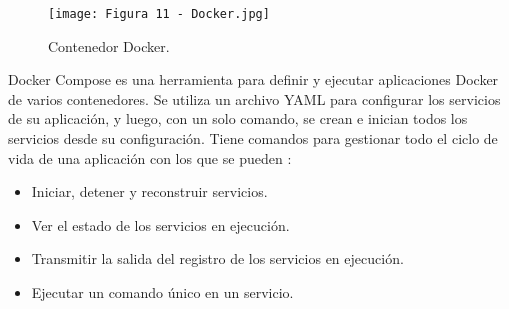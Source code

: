 \begin{figure}[h]
\centering
\texttt{[image: Figura 11 - Docker.jpg]}
\caption[Docker]{Contenedor Docker. \footnotemark}
\label{fig:11}
\end{figure}

Docker Compose es una herramienta para definir y ejecutar aplicaciones Docker de varios contenedores. Se utiliza un archivo YAML para configurar los servicios de su aplicación, y luego, con un solo comando, se crean e inician todos los servicios desde su configuración. Tiene comandos para gestionar todo el ciclo de vida de una aplicación con los que se pueden \citep{23}:

\begin{itemize}
	\item Iniciar, detener y reconstruir servicios.
	\item Ver el estado de los servicios en ejecución.
	\item Transmitir la salida del registro de los servicios en ejecución.
	\item Ejecutar un comando único en un servicio.
\end{itemize}
